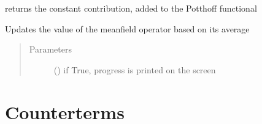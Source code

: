 \documentclass[letterpaper,10pt,english]{sphinxmanual}
\begin{document}
\begin{fulllineitems}
\begin{fulllineitems}
\label{\detokenize{utilities:pyqcm.hartree.hartree.omega_var}}
\sphinxAtStartPar
returns the constant contribution, added to the Potthoff functional

\end{fulllineitems}


\begin{fulllineitems}
\label{\detokenize{utilities:pyqcm.hartree.hartree.update}}
\sphinxAtStartPar
Updates the value of the mean\sphinxhyphen{}field operator based on its average
\begin{quote}\begin{description}
\item[{Parameters}] \leavevmode
\sphinxAtStartPar
{} () \textendash{} if True, progress is printed on the screen

\end{description}\end{quote}

\end{fulllineitems}


\end{fulllineitems}



\section{Counterterms}
\label{\detokenize{utilities:counterterms}}
\end{document}
